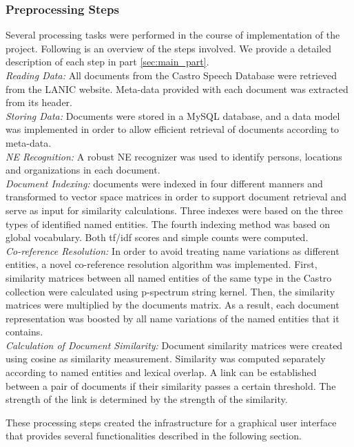 \subsubsection{Preprocessing Steps}
Several processing tasks were performed in the course of implementation of the project. Following is an overview of the steps involved. We provide a  detailed description of each step in part  \ref{sec:main_part}.\\
\emph{Reading Data:} All documents from the Castro Speech Database were retrieved from the LANIC website. Meta-data provided with each document was extracted from its header. \\
\emph{Storing Data:} Documents were stored in a MySQL database, and a data model was implemented in order to allow efficient retrieval of documents according to meta-data. \\
\emph{NE Recognition:} A robust NE recognizer was used to identify persons, locations and organizations in each document.\\
\emph{Document Indexing:} documents were indexed in four different manners and transformed to vector space matrices in order to support document retrieval and serve as input for similarity calculations. Three indexes were based on the three types of identified named entities. The fourth indexing method was based on global vocabulary. Both tf/idf scores and simple counts were computed.\\
\emph{Co-reference Resolution:} In order to avoid treating name variations as different entities, a novel co-reference resolution algorithm was implemented. First, similarity matrices between all named entities of the same type in the Castro collection were calculated using p-spectrum string kernel. Then, the similarity matrices were multiplied by the documents matrix. As a result, each document representation was boosted by all name variations of the named entities that it contains.\\
\emph{Calculation of Document Similarity:} Document similarity matrices were created using cosine as similarity measurement. Similarity was computed separately according to named entities and  lexical overlap. A link can be established between a pair of documents if their similarity passes a certain threshold. The strength of the link is determined by the strength of the similarity.

These processing steps created the infrastructure for a graphical user interface that provides several
functionalities described in the following section.

